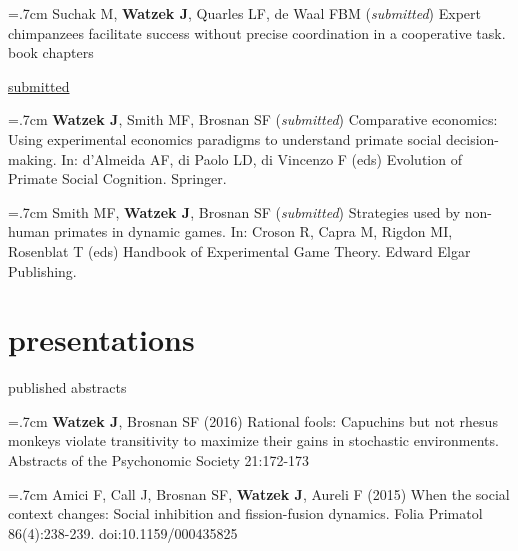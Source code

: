 \documentclass[]{friggeri-cv}
\begin{document}
\hangindent=.7cm Suchak M, \textbf{Watzek J}, Quarles LF, de Waal FBM (\emph{submitted}) Expert chimpanzees facilitate success without precise coordination in a cooperative task. \\[-.1cm]





{\subfont\large{} book chapters}


\hspace{.35cm} { \underline{submitted}} %

\hangindent=.7cm \textbf{Watzek J}, Smith MF, Brosnan SF (\emph{submitted}) Comparative economics: Using experimental economics paradigms to understand primate social decision-making. In: d'Almeida AF, di Paolo LD, di Vincenzo F (eds) Evolution of Primate Social Cognition. Springer.

\hangindent=.7cm Smith MF, \textbf{Watzek J}, Brosnan SF (\emph{submitted}) Strategies used by non-human primates in dynamic games. In: Croson R, Capra M, Rigdon MI, Rosenblat T (eds) Handbook of Experimental Game Theory. Edward Elgar Publishing. \\[-.1cm]


\section{presentations}


{\subfont\large{} published abstracts}

\hangindent=.7cm \textbf{Watzek J}, Brosnan SF (2016) Rational fools: Capuchins but not rhesus monkeys violate transitivity to maximize their gains in stochastic environments. Abstracts of the Psychonomic Society 21:172-173

\hangindent=.7cm Amici F, Call J, Brosnan SF, \textbf{Watzek J}, Aureli F (2015) When the social context changes: Social inhibition and fission-fusion dynamics. Folia Primatol 86(4):238-239. doi:10.1159/000435825
\end{document}
